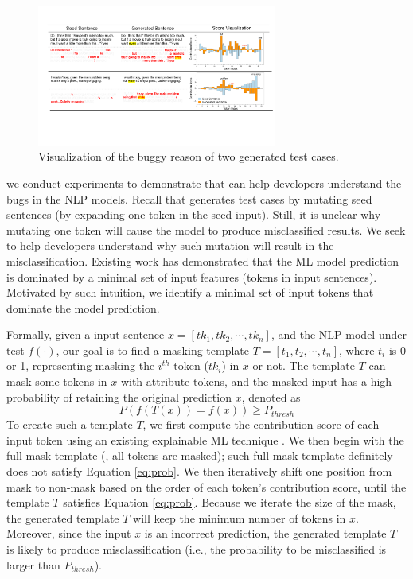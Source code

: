 \begin{figure}
    \centering
    \includegraphics[width=0.7\textwidth]{figs/explain.pdf}
    \vspace{-4mm}
    \caption{Visualization of the buggy reason of two \tool generated test cases.}
    \label{fig:explain}
\end{figure}


we conduct experiments to demonstrate that \tool can help developers understand the bugs in the NLP models.
Recall that \tool generates test cases by mutating seed sentences (\eg by expanding one token in the seed input). Still, it is unclear why mutating one token will cause the model to produce misclassified results.
We seek to help developers understand why such mutation will result in the misclassification. 
Existing work \cite{simin2020denas, lemna, lime} has demonstrated that the ML model prediction is dominated by a minimal set of input features (\ie tokens in input sentences). Motivated by such intuition, we identify a minimal set of input tokens that dominate the model prediction.

Formally, given a input sentence $x = [tk_1, tk_2, \cdots, tk_n]$, and the NLP model under test $f(\cdot)$, our goal is to find a masking template $T = [t_1, t_2, \cdots, t_n]$, where $t_i$ is 0 or 1, representing masking the $i^{th}$ token (\ie $tk_i$) in $x$ or not.
The template $T$ can mask some tokens in $x$ with attribute tokens, and the masked input has a high probability of retaining the original prediction $x$, denoted as
\begin{equation}
    P(f(T(x)) = f(x)) \ge P_{thresh}
    \label{eq:prob}
\end{equation}
To create such a template $T$, we first compute the contribution score of each input token using an existing explainable ML technique \cite{lemna}. We then begin with the full mask template (\ie, all tokens are masked); such full mask template definitely does not satisfy Equation \ref{eq:prob}.
We then iteratively shift one position from mask to non-mask based on the order of each token's contribution score, until the template $T$ satisfies Equation \ref{eq:prob}.
Because we iterate the size of the mask, the generated template $T$ will keep the minimum number of tokens in $x$. Moreover, since the input $x$ is an incorrect prediction, the generated template $T$ is likely to produce misclassification (i.e., the probability to be misclassified is larger than $P_{thresh}$).

